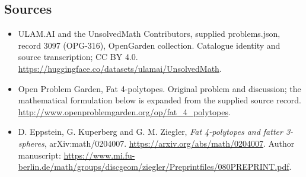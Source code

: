 \documentclass[11pt,a4paper]{article}
\begin{document}
\subsection{Sources}
\begin{itemize}
\item[S1] ULAM.AI and the UnsolvedMath Contributors, supplied problems.json, record 3097 (OPG-316), OpenGarden collection. Catalogue identity and source transcription; CC BY 4.0.
\url{https://huggingface.co/datasets/ulamai/UnsolvedMath}.
\item[S2] Open Problem Garden, Fat 4-polytopes. Original problem and discussion; the mathematical formulation below is expanded from the supplied source record.
\url{http://www.openproblemgarden.org/op/fat_4_polytopes}.
\item[A1] D. Eppstein, G. Kuperberg and G. M. Ziegler, \emph{Fat 4-polytopes and fatter 3-spheres}, arXiv:math/0204007. \url{https://arxiv.org/abs/math/0204007}. Author manuscript: \url{https://www.mi.fu-berlin.de/math/groups/discgeom/ziegler/Preprintfiles/080PREPRINT.pdf}.
\end{itemize}
\end{document}
